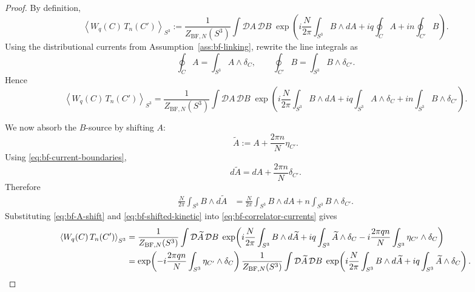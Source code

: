 \begin{proof}
By definition,
\begin{equation}\label{eq:bf-correlator-start}
\left\langle W_q(C)\,T_n(C')\right\rangle_{S^3}
:=
\frac{1}{Z_{\mathrm{BF},N}(S^3)}
\int \mathcal{D}A\,\mathcal{D}B\;
\exp\!\left(
i\frac{N}{2\pi}\int_{S^3} B\wedge dA
+
iq\oint_C A
+
in\oint_{C'} B
\right).
\end{equation}
Using the distributional currents from Assumption~\ref{ass:bf-linking}, rewrite the line integrals as
\begin{equation*}
\oint_C A = \int_{S^3} A\wedge \delta_C,
\qquad
\oint_{C'} B = \int_{S^3} B\wedge \delta_{C'}.
\end{equation*}
Hence
\begin{equation}\label{eq:bf-correlator-currents}
\left\langle W_q(C)\,T_n(C')\right\rangle_{S^3}
=
\frac{1}{Z_{\mathrm{BF},N}(S^3)}
\int \mathcal{D}A\,\mathcal{D}B\;
\exp\!\left(
i\frac{N}{2\pi}\int_{S^3} B\wedge dA
+
iq\int_{S^3} A\wedge \delta_C
+
in\int_{S^3} B\wedge \delta_{C'}
\right).
\end{equation}

\medskip

\noindent We now absorb the $B$-source by shifting $A$:
\begin{equation}\label{eq:bf-A-shift}
\widetilde{A}
:=
A+\frac{2\pi n}{N}\eta_{C'}.
\end{equation}
Using \eqref{eq:bf-current-boundaries},
\begin{equation*}
d\widetilde{A}
=
dA+\frac{2\pi n}{N}\delta_{C'}.
\end{equation*}
Therefore
\begin{align}
\frac{N}{2\pi}\int_{S^3} B\wedge d\widetilde{A}
&=
\frac{N}{2\pi}\int_{S^3} B\wedge dA
+
n\int_{S^3} B\wedge \delta_{C'}.
\label{eq:bf-shifted-kinetic}
\end{align}
Substituting \eqref{eq:bf-A-shift} and \eqref{eq:bf-shifted-kinetic} into \eqref{eq:bf-correlator-currents} gives
\begin{align}
\left\langle W_q(C)\,T_n(C')\right\rangle_{S^3}
&=
\frac{1}{Z_{\mathrm{BF},N}(S^3)}
\int \mathcal{D}\widetilde{A}\,\mathcal{D}B\;
\exp\!\left(
i\frac{N}{2\pi}\int_{S^3} B\wedge d\widetilde{A}
+
iq\int_{S^3} \widetilde{A}\wedge \delta_C
-i\frac{2\pi q n}{N}\int_{S^3} \eta_{C'}\wedge \delta_C
\right) \notag\\
&=
\exp\!\left(
-i\frac{2\pi q n}{N}\int_{S^3} \eta_{C'}\wedge \delta_C
\right)
\frac{1}{Z_{\mathrm{BF},N}(S^3)}
\int \mathcal{D}\widetilde{A}\,\mathcal{D}B\;
\exp\!\left(
i\frac{N}{2\pi}\int_{S^3} B\wedge d\widetilde{A}
+
iq\int_{S^3} \widetilde{A}\wedge \delta_C
\right).
\label{eq:bf-correlator-after-shift}
\end{align}


\end{proof}
